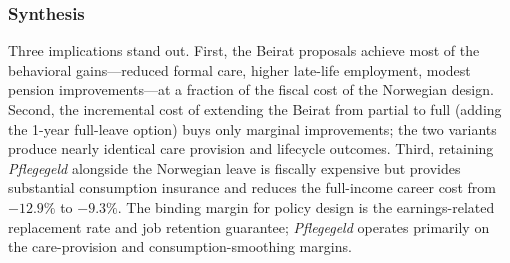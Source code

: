 \subsubsection{Synthesis}

Three implications stand out. First, the Beirat proposals achieve most of the behavioral gains---reduced formal care, higher late-life employment, modest pension improvements---at a fraction of the fiscal cost of the Norwegian design. Second, the incremental cost of extending the Beirat from partial to full (adding the 1-year full-leave option) buys only marginal improvements; the two variants produce nearly identical care provision and lifecycle outcomes. Third, retaining \textit{Pflegegeld} alongside the Norwegian leave is fiscally expensive but provides substantial consumption insurance and reduces the full-income career cost from $-12.9\%$ to $-9.3\%$. The binding margin for policy design is the earnings-related replacement rate and job retention guarantee; \textit{Pflegegeld} operates primarily on the care-provision and consumption-smoothing margins.
